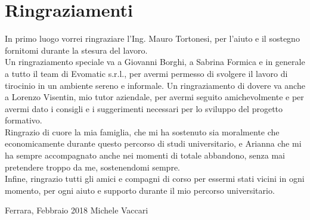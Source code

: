 
\cleardoublepage
{}


\begingroup
\let\clearpage\relax
\let\cleardoublepage\relax
\let\cleardoublepage\relax
\chapter*{Ringraziamenti}

In primo luogo vorrei ringraziare l'Ing. Mauro Tortonesi, per l’aiuto e il sostegno fornitomi durante la stesura del lavoro.\\


Un ringraziamento speciale va a Giovanni Borghi, a Sabrina Formica e in generale a tutto il team di Evomatic s.r.l., per avermi permesso di svolgere il lavoro di tirocinio in un ambiente sereno e informale. Un ringraziamento di dovere va anche a Lorenzo Visentin, mio tutor aziendale, per avermi seguito amichevolmente e per avermi dato i consigli e i suggerimenti necessari per lo sviluppo del progetto formativo.\\


Ringrazio di cuore la mia famiglia, che mi ha sostenuto sia moralmente che economicamente durante questo percorso di studi universitario, e Arianna che mi ha sempre accompagnato anche nei momenti di totale abbandono, senza mai pretendere troppo da me, sostenendomi sempre.\\


Infine, ringrazio tutti gli amici e compagni di corso per essermi stati vicini in ogni momento, per ogni aiuto e supporto durante il mio percorso universitario.\\

\bigskip

\noindent Ferrara, Febbraio 2018
\hfill Michele Vaccari

\endgroup